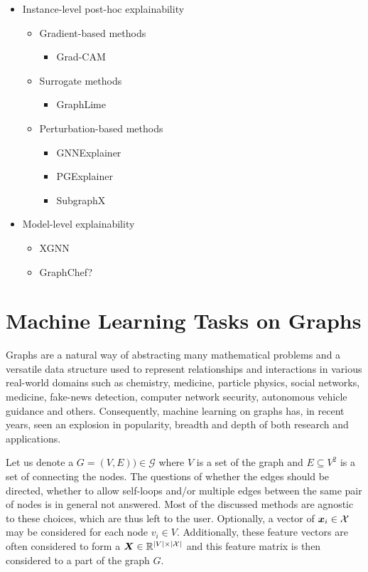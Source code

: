 \begin{itemize}
\begin{itemize}
			\item Instance-level post-hoc explainability
				\begin{itemize}
					\item Gradient-based methods
						\begin{itemize}
							\item Grad-CAM
						\end{itemize}
					\item Surrogate methods
						\begin{itemize}
							\item GraphLime
						\end{itemize}
					\item Perturbation-based methods
						\begin{itemize}
							\item GNNExplainer
							\item PGExplainer
							\item SubgraphX
						\end{itemize}
				\end{itemize}
			\item Model-level explainability
				\begin{itemize}
					\item XGNN
					\item GraphChef?
				\end{itemize}
		\end{itemize}
\end{itemize}


\section{Machine Learning Tasks on Graphs}

Graphs are a natural way of abstracting many mathematical problems and a versatile data structure used to represent relationships and interactions in various real-world domains such as chemistry, medicine, particle physics, social networks, medicine, fake-news detection, computer network security, autonomous vehicle guidance and others. Consequently, machine learning on graphs has, in recent years, seen an explosion in popularity, breadth and depth of both research and applications.

Let us denote a  \( G = \left( V, E \right)) \in \mathcal{G} \) where \( V \) is a set of the graph  and \( E \subseteq V^2 \) is a set of  connecting the nodes. The questions of whether the edges should be directed, whether to allow self-loops and/or multiple edges between the same pair of nodes is in general not answered. Most of the discussed methods are agnostic to these choices, which are thus left to the user. Optionally, a vector of  \( \bm{x}_i \in \mathcal{X} \) may be considered for each node \( v_i \in V \). Additionally, these feature vectors are often considered to form a  \( \bm{X} \in \mathbb{R}^{\left\lvert V \right\rvert \times \left\lvert \mathcal{X} \right\rvert} \) and this feature matrix is then considered to a part of the graph \( G \). 

